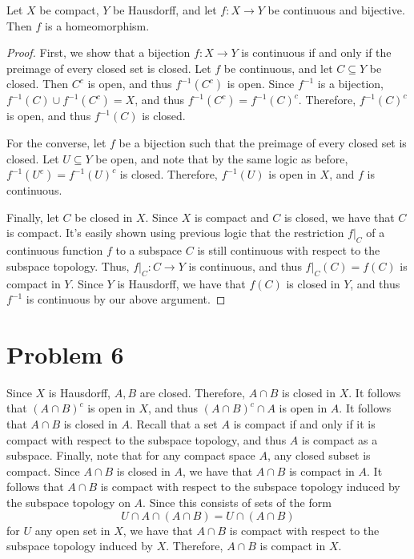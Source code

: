 \documentclass[11pt, letterpaper]{article}
\begin{document}
\begin{lemma}\label{lma:1}
	Let $X$ be compact, $Y$ be Hausdorff, and let $f : X \to Y$ be continuous and bijective. Then $f$ is a homeomorphism.
\end{lemma}
\begin{proof}
	First, we show that a bijection $f : X \to Y$ is continuous if and only if the preimage of every closed set is closed. Let $f$ be continuous, and let $C\subseteq Y$ be closed. Then $C^{c} $ is open, and thus $f^{-1} (C^{c} )$ is open. Since $f^{-1} $ is a bijection, $f^{-1} (C)\cup f^{-1} (C^{c} )=X$, and thus $f^{-1} (C^{c} )=f^{-1} (C)^{c} $. Therefore, $f^{-1} (C)^{c} $ is open, and thus $f^{-1} (C)$ is closed.

	For the converse, let $f$ be a bijection such that the preimage of every closed set is closed. Let $U\subseteq Y$ be open, and note that by the same logic as before, $f^{-1} (U^{c} )=f^{-1} (U)^{c} $ is closed. Therefore, $f^{-1} (U)$ is open in $X$, and $f$ is continuous.

	Finally, let $C$ be closed in $X$. Since $X$ is compact and $C$ is closed, we have that $C$ is compact. It's easily shown using previous logic that the restriction $f|_C$ of a continuous function $f$ to a subspace $C$ is still continuous with respect to the subspace topology. Thus, $f|_C : C \to Y$ is continuous, and thus $f|_C(C)=f(C)$ is compact in $Y$. Since $Y$ is Hausdorff, we have that $f(C)$ is closed in $Y$, and thus $f^{-1} $ is continuous by our above argument.
\end{proof}

\section*{Problem 6}
Since $X$ is Hausdorff, $A,B$ are closed. Therefore, $A \cap B$ is closed in $X$. It follows that $\left( A \cap B \right) ^{c} $ is open in $X$, and thus $\left( A \cap B \right) ^{c} \cap A$ is open in $A$. It follows that $A \cap B$ is closed in $A$. Recall that a set $A$ is compact if and only if it is compact with respect to the subspace topology, and thus $A$ is compact as a subspace. Finally, note that for any compact space $A$, any closed subset is compact. Since $A \cap B$ is closed in $A$, we have that $A \cap B$ is compact in $A$. It follows that $A \cap B$ is compact with respect to the subspace topology induced by the subspace topology on $A$. Since this consists of sets of the form
\[
	U \cap A \cap \left( A \cap B \right) =U \cap \left( A \cap B \right) 
\]
for $U$ any open set in $X$, we have that $A \cap B$ is compact with respect to the subspace topology induced by $X$. Therefore, $A \cap B$ is compact in $X$.
\end{document}
